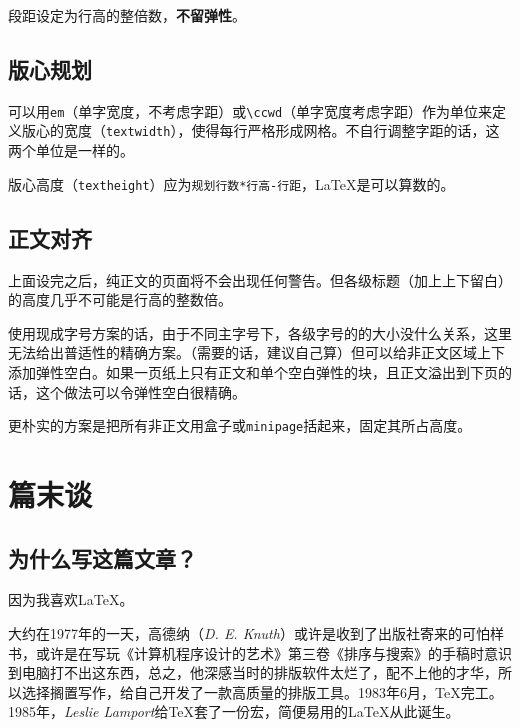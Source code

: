 \documentclass[10pt,openany]{book}
\begin{document}
\begin{sloppypar}
    段距设定为行高的整倍数，\textbf{不留弹性}。

    

    \section{版心规划}

    可以用\texttt{em}（单字宽度，不考虑字距）或\texttt{\textbackslash{}ccwd}（单字宽度考虑字距）作为单位来定义版心的宽度（\texttt{textwidth}），使得每行严格形成网格。不自行调整字距的话，这两个单位是一样的。

    版心高度（\texttt{textheight}）应为\texttt{规划行数*行高-行距}，{\LaTeX}是可以算数的。

    

    \section{正文对齐}

    上面设完之后，纯正文的页面将不会出现任何警告。但各级标题（加上上下留白）的高度几乎不可能是行高的整数倍。

    使用现成字号方案的话，由于不同主字号下，各级字号的的大小没什么关系，这里无法给出普适性的精确方案。（需要的话，建议自己算）但可以给非正文区域上下添加弹性空白。如果一页纸上只有正文和单个空白弹性的块，且正文溢出到下页的话，这个做法可以令弹性空白很精确。

    

    更朴实的方案是把所有非正文用盒子或\texttt{minipage}括起来，固定其所占高度。

    

    \chapter{篇末谈}

    \section{为什么写这篇文章？}

    因为我喜欢{\LaTeX}。

    大约在1977年的一天，高德纳（\textit{D. E. Knuth}）或许是收到了出版社寄来的可怕样书，或许是在写玩《计算机程序设计的艺术》第三卷《排序与搜索》的手稿时意识到电脑打不出这东西，总之，他深感当时的排版软件太烂了，配不上他的才华，所以选择搁置写作，给自己开发了一款高质量的排版工具。1983年6月，{\TeX}完工。1985年，\textit{Leslie Lamport}给{\TeX}套了一份宏，简便易用的{\LaTeX}从此诞生。


\end{sloppypar}
\end{document}
